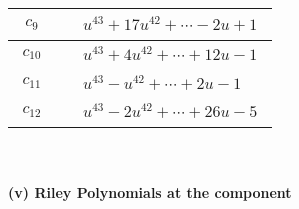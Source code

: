\documentclass[1p]{elsarticle_modified}
\theoremstyle{definition}
\begin{document}
\begin{tabular}{m{50pt}|m{274pt}}
\hline $$\begin{aligned}c_{9}\end{aligned}$$&$\begin{aligned}
&u^{43}+17 u^{42}+\cdots-2 u+1
\end{aligned}$\\
\hline $$\begin{aligned}c_{10}\end{aligned}$$&$\begin{aligned}
&u^{43}+4 u^{42}+\cdots+12 u-1
\end{aligned}$\\
\hline $$\begin{aligned}c_{11}\end{aligned}$$&$\begin{aligned}
&u^{43}- u^{42}+\cdots+2 u-1
\end{aligned}$\\
\hline $$\begin{aligned}c_{12}\end{aligned}$$&$\begin{aligned}
&u^{43}-2 u^{42}+\cdots+26 u-5
\end{aligned}$\\
\hline
\end{tabular}\\~\\
\newpage\renewcommand{\arraystretch}{1}
\flushleft \textbf{(v) Riley Polynomials at the component}\newline \\
\end{document}
